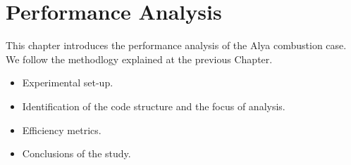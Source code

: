 \chapter{Performance Analysis}

This chapter introduces the performance analysis of the Alya combustion case. We follow the methodlogy explained at the previous Chapter.
\begin{itemize}
  \item Experimental set-up.
  \item Identification of the code structure and the focus of analysis.
  \item Efficiency metrics.
  \item Conclusions of the study.
\end{itemize}









